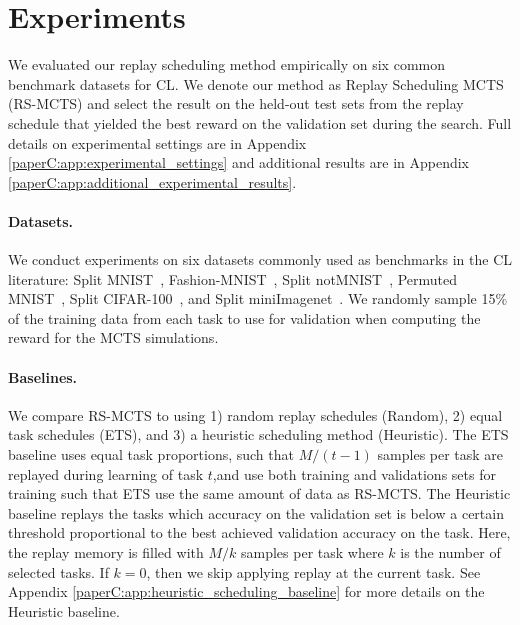 



\section{Experiments}\label{paperC:sec:experiments}

We evaluated our replay scheduling method empirically on six common benchmark datasets for CL. 
We denote our method as Replay Scheduling MCTS (RS-MCTS) and select the result on the held-out test sets from the replay schedule that yielded the best reward on the validation set during the search.
Full details on experimental settings are in Appendix \ref{paperC:app:experimental_settings} and additional results are in Appendix \ref{paperC:app:additional_experimental_results}. 

\vspace{-3mm}
\paragraph{Datasets.} We conduct experiments on six datasets commonly used as benchmarks in the CL literature: Split MNIST~, Fashion-MNIST~, Split notMNIST~, Permuted MNIST~, Split CIFAR-100~, and Split miniImagenet~. We randomly sample 15\% of the training data from each task to use for validation when computing the reward for the MCTS simulations. 

\vspace{-3mm}
\paragraph{Baselines.} We compare RS-MCTS to using 1) random replay schedules (Random), 2) equal task schedules (ETS), and 3) a heuristic scheduling method (Heuristic). The ETS baseline uses equal task proportions, such that $M/(t-1)$ samples per task are replayed during learning of task $t$,and use both training and validations sets for training such that ETS use the same amount of data as RS-MCTS. %
The Heuristic baseline replays the tasks which accuracy on the validation set is below a certain threshold proportional to the best achieved validation accuracy on the task. Here, the replay memory is filled with $M/k$ samples per task where $k$ is the number of selected tasks. If $k=0$, then we skip applying replay at the current task.  
See Appendix \ref{paperC:app:heuristic_scheduling_baseline} for more details on the Heuristic baseline. 

